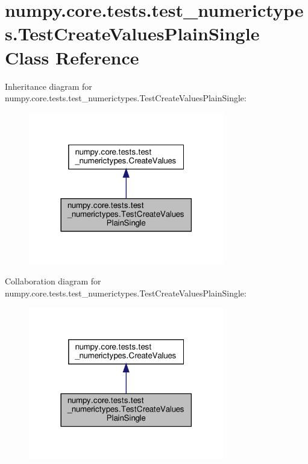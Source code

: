 \hypertarget{classnumpy_1_1core_1_1tests_1_1test__numerictypes_1_1TestCreateValuesPlainSingle}{}\section{numpy.\+core.\+tests.\+test\+\_\+numerictypes.\+Test\+Create\+Values\+Plain\+Single Class Reference}
\label{classnumpy_1_1core_1_1tests_1_1test__numerictypes_1_1TestCreateValuesPlainSingle}


Inheritance diagram for numpy.\+core.\+tests.\+test\+\_\+numerictypes.\+Test\+Create\+Values\+Plain\+Single\+:
\nopagebreak
\begin{figure}[H]
\begin{center}
\leavevmode
\includegraphics[width=242pt]{classnumpy_1_1core_1_1tests_1_1test__numerictypes_1_1TestCreateValuesPlainSingle__inherit__graph}
\end{center}
\end{figure}


Collaboration diagram for numpy.\+core.\+tests.\+test\+\_\+numerictypes.\+Test\+Create\+Values\+Plain\+Single\+:
\nopagebreak
\begin{figure}[H]
\begin{center}
\leavevmode
\includegraphics[width=242pt]{classnumpy_1_1core_1_1tests_1_1test__numerictypes_1_1TestCreateValuesPlainSingle__coll__graph}
\end{center}
\end{figure}
